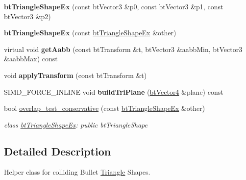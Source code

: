 \begin{DoxyCompactItemize}
\item 
\hypertarget{classbt_triangle_shape_ex_a7809d8da52c8228d662994dc169f82b0}{{\bfseries bt\+Triangle\+Shape\+Ex} (const bt\+Vector3 \&p0, const bt\+Vector3 \&p1, const bt\+Vector3 \&p2)}\label{classbt_triangle_shape_ex_a7809d8da52c8228d662994dc169f82b0}

\item 
\hypertarget{classbt_triangle_shape_ex_ab138dd8e1b438d7fd94a1b1ec91ae439}{{\bfseries bt\+Triangle\+Shape\+Ex} (const \hyperlink{classbt_triangle_shape_ex}{bt\+Triangle\+Shape\+Ex} \&other)}\label{classbt_triangle_shape_ex_ab138dd8e1b438d7fd94a1b1ec91ae439}

\item 
\hypertarget{classbt_triangle_shape_ex_a72637e39686188bd81b9d667a62f55dc}{virtual void {\bfseries get\+Aabb} (const bt\+Transform \&t, bt\+Vector3 \&aabb\+Min, bt\+Vector3 \&aabb\+Max) const }\label{classbt_triangle_shape_ex_a72637e39686188bd81b9d667a62f55dc}

\item 
\hypertarget{classbt_triangle_shape_ex_a7d4d509262b012617f76b05d531a64a7}{void {\bfseries apply\+Transform} (const bt\+Transform \&t)}\label{classbt_triangle_shape_ex_a7d4d509262b012617f76b05d531a64a7}

\item 
\hypertarget{classbt_triangle_shape_ex_a004b61bd84c01fde9edd25e0c538bd1d}{S\+I\+M\+D\+\_\+\+F\+O\+R\+C\+E\+\_\+\+I\+N\+L\+I\+N\+E void {\bfseries build\+Tri\+Plane} (\hyperlink{classbt_vector4}{bt\+Vector4} \&plane) const }\label{classbt_triangle_shape_ex_a004b61bd84c01fde9edd25e0c538bd1d}

\item 
\hypertarget{classbt_triangle_shape_ex_a8642843da440361eecf27d5a074d6231}{bool \hyperlink{classbt_triangle_shape_ex_a8642843da440361eecf27d5a074d6231}{overlap\+\_\+test\+\_\+conservative} (const \hyperlink{classbt_triangle_shape_ex}{bt\+Triangle\+Shape\+Ex} \&other)}\label{classbt_triangle_shape_ex_a8642843da440361eecf27d5a074d6231}

\begin{DoxyCompactList}\small\item\em class \hyperlink{classbt_triangle_shape_ex}{bt\+Triangle\+Shape\+Ex}\+: public bt\+Triangle\+Shape \end{DoxyCompactList}\end{DoxyCompactItemize}


\subsection{Detailed Description}
Helper class for colliding Bullet \hyperlink{class_triangle}{Triangle} Shapes. 

